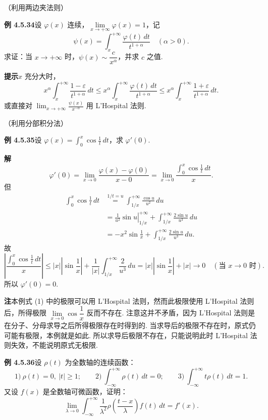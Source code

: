 \documentclass[UTF8,12pt,a4paper,fontset=fandol]{ctexart}
\begin{document}
（利用两边夹法则）

\noindent\textbf{例 4.5.34}\quad 设 $\varphi(x)$ 连续，$\lim\limits_{x\to+\infty}\varphi(x)=1$，记
\[
\psi(x)=\int_x^{+\infty}\frac{\varphi(t)\,dt}{t^{1+\alpha}}\quad(\alpha>0).
\]
求证：当 $x\to+\infty$ 时，$\psi(x)\sim\dfrac{c}{x^\alpha}$，并求 $c$ 之值.

\noindent\textbf{提示}\quad $x$ 充分大时，
\[
x^\alpha\int_x^{+\infty}\frac{1-\varepsilon}{t^{1+\alpha}}\,dt
\le x^\alpha\int_x^{+\infty}\frac{\varphi(t)\,dt}{t^{1+\alpha}}
\le x^\alpha\int_x^{+\infty}\frac{1+\varepsilon}{t^{1+\alpha}}\,dt.
\]
或直接对 $\displaystyle\lim_{x\to+\infty}\frac{\psi(x)}{x^{-\alpha}}$ 用 L'Hospital 法则.

（利用分部积分法）

\noindent\textbf{例 4.5.35}\quad 设 $\varphi(x)=\displaystyle\int_0^x\cos\frac1t\,dt$，求 $\varphi'(0)$.

\noindent\textbf{解}\quad
\begin{equation}
\varphi'(0)=\lim_{x\to0}\frac{\varphi(x)-\varphi(0)}{x-0}
=\lim_{x\to0}\frac{\displaystyle\int_0^x\cos\frac1t\,dt}{x}. \tag{1}
\end{equation}
但
\[
\begin{aligned}
\int_0^x\cos\frac1t\,dt
&\stackrel{1/t=u}{=}\int_{1/x}^{+\infty}\frac{\cos u}{u^2}\,du\\
&=\left.\frac1{u^2}\sin u\right|_{1/x}^{+\infty}
+\int_{1/x}^{+\infty}\frac{2\sin u}{u^3}\,du\\
&=-x^2\sin\frac1x+\int_{1/x}^{+\infty}\frac{2\sin u}{u^3}\,du.
\end{aligned}
\]
故
\[
\left|\frac{\displaystyle\int_0^x\cos\frac1t\,dt}{x}\right|
\le |x|\left|\sin\frac1x\right|+\frac1{|x|}\int_{1/x}^{+\infty}\frac2{u^3}\,du
=|x|\left|\sin\frac1x\right|+|x|\to0\quad(\text{当 }x\to0\text{ 时}).
\]
所以 $\varphi'(0)=0$.

\noindent\textbf{注}\quad 本例式 (1) 中的极限可以用 L'Hospital 法则，然而此极限使用 L'Hospital 法则后，所得极限
$\lim\limits_{x\to0}\cos\dfrac1x$ 反而不存在. 注意这并不矛盾，因为 L'Hospital 法则是在分子、分母求导之后所得极限存在时得到的.
当求导后的极限不存在时，原式仍可能有极限，本例就是如此. 所以求导后极限不存在，只能说明此时 L'Hospital 法则失效，不能说明原式无极限.

\noindent\textbf{例 4.5.36}\quad 设 $\rho(t)$ 为全数轴的连续函数：
\[
1)\ \rho(t)=0,\ |t|\ge1;\qquad
2)\ \int_{-\infty}^{+\infty}\rho(t)\,dt=0;\qquad
3)\ \int_{-\infty}^{+\infty}t\rho(t)\,dt=1.
\]
又设 $f(x)$ 是全数轴可微函数，证明：
\[
\lim_{\lambda\to0}\int_{-\infty}^{+\infty}\frac1{\lambda^2}\rho\left(\frac{t-x}{\lambda}\right)f(t)\,dt=f'(x).
\]
\end{document}
